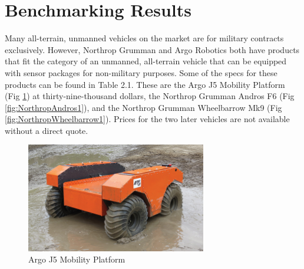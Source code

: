 \section{Benchmarking Results}
Many all-terrain, unmanned vehicles on the market are for military contracts exclusively. However, Northrop Grumman and Argo Robotics both have products that fit the category of an unmanned, all-terrain vehicle that can be equipped with sensor packages for non-military purposes. Some of the specs for these products can be found in Table 2.1. These are the Argo J5 Mobility Platform (Fig \ref{fig:ArgoPlatform1}) at thirty-nine-thousand dollars, the Northrop Grumman Andros F6 (Fig \ref{fig:NorthropAndros1}), and the Northrop Grumman Wheelbarrow Mk9 (Fig \ref{fig:NorthropWheelbarrow1}). Prices for the two later vehicles are not available without a direct quote. 

\begin{table}[H]
\centering
{}
\caption{\label{tab:current} Current Product Comparison}
\end{table}

\begin{figure}[H]
\centering
\includegraphics[width=0.7\textwidth]{argo-j5-mobility-platform-2-small-1.jpg}
\caption{Argo J5 Mobility Platform}
\label{fig:ArgoPlatform1}
\end{figure}


